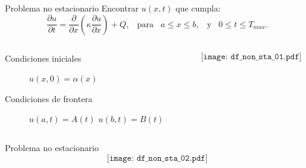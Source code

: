 \documentclass{beamer}
\begin{document}
\begin{frame}
\begin{center}
\end{center}
\end{frame}

\begin{frame}{Problema no estacionario}
Encontrar $u(x,t)$ que cumpla:
\begin{equation}\label{eq:PVI}
\frac{\partial u}{\partial t} = \frac{\partial}{\partial x} \left( \kappa \frac{\partial u}{\partial x} \right) + Q,
\,\,\, \text{ para } \,\,\, a \leq x \leq b, \,\,\, \text{ y } \,\,\, 0 \leq t \leq T_{max}.
\end{equation}
%
\begin{columns}
\begin{column}{0.40\textwidth}
\begin{description}
	\item[Condiciones iniciales] $u(x,0) = \alpha(x)$

\strut

	\item[Condiciones de frontera]
	$u(a,t)=A(t)$  $u(b,t)=B(t)$
\end{description}
\vspace{2cm}
\end{column}
\begin{column}{0.60\textwidth}
$$\texttt{[image: df\_non\_sta\_01.pdf]}$$
\end{column}
\end{columns}

\end{frame}

\begin{frame}{Problema no estacionario}
$$\texttt{[image: df\_non\_sta\_02.pdf]}$$

\vspace{2cm}

\end{frame}
\end{document}
